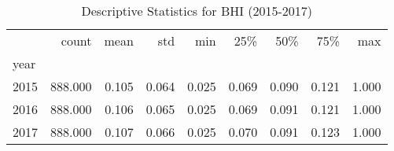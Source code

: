 \begin{table}
\centering
\caption{Descriptive Statistics for BHI (2015-2017)}
\label{tab:bhi}
\begin{tabular}{lrrrrrrrr}
\toprule
{} &   count &  mean &   std &   min &   25\% &   50\% &   75\% &   max \\
year &         &       &       &       &       &       &       &       \\
\midrule
2015 & 888.000 & 0.105 & 0.064 & 0.025 & 0.069 & 0.090 & 0.121 & 1.000 \\
2016 & 888.000 & 0.106 & 0.065 & 0.025 & 0.069 & 0.091 & 0.121 & 1.000 \\
2017 & 888.000 & 0.107 & 0.066 & 0.025 & 0.070 & 0.091 & 0.123 & 1.000 \\
\bottomrule
\end{tabular}
\end{table}
